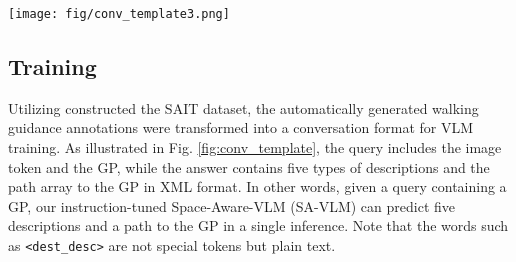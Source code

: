 \begin{figure*}[t]
  \centering
  \texttt{[image: fig/conv\_template3.png]}
    \vspace{-8mm}
    \caption{An image and annotations of the SAIT dataset: queries were generated based on the goal positions, and answers were structured in XML format. Note that words like \texttt{<dest\_desc>} are plain text in the answer, with only the image token in the query treated as a special token.}
  \label{fig:conv_template}
  \vspace{-5mm}
\end{figure*}
\subsection{Training} 
\vspace{-2pt}
Utilizing constructed the SAIT dataset, the automatically generated walking guidance annotations were transformed into a conversation format for VLM training.
As illustrated in Fig. \ref{fig:conv_template}, the query includes the image token and the GP, while the answer contains five types of descriptions and the path array to the GP in XML format.
In other words, given a query containing a GP, our instruction-tuned Space-Aware-VLM (SA-VLM) can predict five descriptions and a path to the GP in a single inference.
Note that the words such as \texttt{<dest\_desc>} are not special tokens but plain text.
